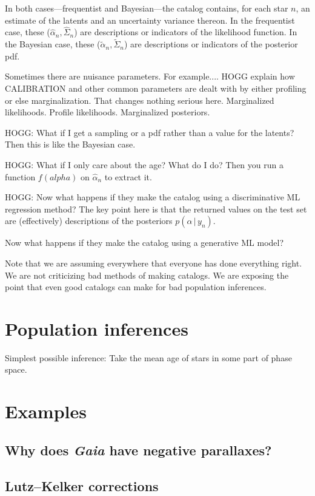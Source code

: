 \documentclass[10pt]{article}
\newcommand{\given}{\,|\,}
\begin{document}
In both cases---frequentist and Bayesian---the catalog contains, for each star $n$, an estimate of the latents and an uncertainty variance thereon.
In the frequentist case, these ($\hat{\alpha}_n, \hat{\Sigma}_n$) are descriptions or indicators of the likelihood function.
In the Bayesian case, these ($\tilde{\alpha}_n, \tilde{\Sigma}_n$) are descriptions or indicators of the posterior pdf.

Sometimes there are nuisance parameters.
For example.... HOGG explain how CALIBRATION and other common parameters are dealt with by either profiling or else marginalization.
That changes nothing serious here.
Marginalized likelihoods.
Profile likelihoods.
Marginalized posteriors.

HOGG: What if I get a sampling or a pdf rather than a value for the latents? Then this is like the Bayesian case.

HOGG: What if I only care about the age? What do I do? Then you run a function $f(alpha)$ on $\hat{\alpha}_n$ to extract it.

HOGG: Now what happens if they make the catalog using a discriminative ML regression method?
The key point here is that the returned values on the test set are (effectively) descriptions of the posteriors $p(\alpha\given y_n)$.


Now what happens if they make the catalog using a generative ML model?

Note that we are assuming everywhere that everyone has done everything right.
We are not criticizing bad methods of making catalogs.
We are exposing the point that even good catalogs can make for bad population inferences.

\section{Population inferences}

Simplest possible inference: Take the mean age of stars in some part of phase space.

\section{Examples}

\subsection{Why does \textsl{Gaia} have negative parallaxes?}

\subsection{Lutz--Kelker corrections}
\end{document}
